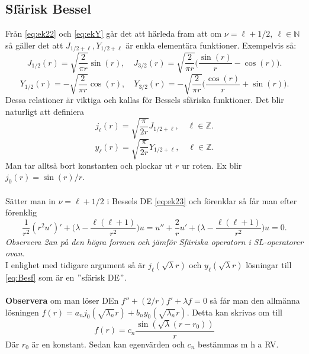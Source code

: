 \documentclass{article}
\begin{document}
\subsection{Sfärisk Bessel}
Från \eqref{eq:ek22} och \eqref{eq:ekY} går det att härleda fram att om $\nu=\ell+1/2, \ \ell\in\mathbb{N}$ så gäller det att $J_{1/2+\ell},Y_{1/2+\ell}$ är enkla elementära funktioner. Exempelvis så:
$$J_{1/2}(r)=\sqrt{\frac{2}{\pi r}}\sin(r), \quad J_{3/2}(r)=\sqrt{\frac{2}{\pi r}}\Big(\frac{\sin(r)}{r}-\cos(r)\Big).$$
$$Y_{1/2}(r)=-\sqrt{\frac{2}{\pi r}}\cos(r), \quad Y_{3/2}(r)=-\sqrt{\frac{2}{\pi r}}\Big(\frac{\cos(r)}{r}+\sin(r)\Big).$$
Dessa relationer är viktiga och kallas för Bessels sfäriska funktioner. Det blir naturligt att definiera
$$
j_{\ell}(r)=\sqrt{\frac{\pi }{2r}}J_{1/2+\ell}, \quad \ell\in\mathbb{Z}.
$$
$$
y_{\ell}(r)=\sqrt{\frac{\pi }{2r}}Y_{1/2+\ell}, \quad \ell\in\mathbb{Z}.
$$
Man tar alltså bort konstanten och plockar ut $r$ ur roten. Ex blir $j_0(r)=\sin(r)/r$.\\ \\
Sätter man in $\nu=\ell+1/2$ i Bessels DE \eqref{eq:ek23} och förenklar så får man efter förenklig
\begin{equation}\label{eq:Besf}
    \frac{1}{r^2}(r^2u')'+\Big(\lambda-\frac{\ell(\ell+1)}{r^2}\Big)u=u''+\frac{2}{r}u'+\Big(\lambda-\frac{\ell(\ell+1)}{r^2}\Big)u=0.
\end{equation}
\textit{Observera 2an på den högra formen och jämför Sfäriska operatorn i SL-operatorer ovan.}\\
I enlighet med tidigare argument så är $j_{\ell}(\sqrt{\lambda}r)$ och $y_{\ell}(\sqrt{\lambda}r)$ lösningar till \eqref{eq:Besf} som är en $"$sfärisk DE$"$.\\ \\
\textbf{Observera} om man löser DEn $f''+(2/r)f'+\lambda f=0$ så får man den allmänna lösningen $f(r)=a_nj_0(\sqrt{\lambda_n}r)+b_ny_0(\sqrt{\lambda_n}r)$. Detta kan skrivas om till
\begin{equation}
    f(r)=c_n\frac{\sin(\sqrt{\lambda}(r-r_0))}{r}
\end{equation}
Där $r_0$ är en konstant. Sedan kan egenvärden och $c_n$ bestämmas m h a RV.
\end{document}
